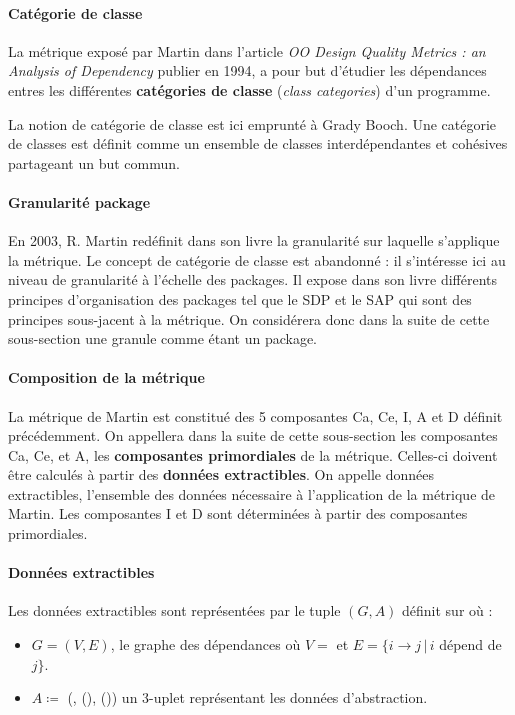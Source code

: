 \documentclass{scrartcl}
\begin{document}
    \paragraph{Catégorie de classe}La métrique exposé par Martin dans l'article \textit{OO Design Quality Metrics : an Analysis of Dependency}\cite{Martin:1994} publier en 1994, a pour but d'étudier les dépendances entres les différentes \textbf{catégories de classe} (\emph{class categories}) d'un programme. 
    
    La notion de catégorie de classe est ici emprunté à Grady Booch\cite{Booch:1991}. Une catégorie de classes est définit comme un ensemble de classes interdépendantes et cohésives partageant un but commun.
    
    \paragraph{Granularité package}En 2003, R. Martin redéfinit dans son livre\cite{Martin:2003} la granularité sur laquelle s'applique la métrique. Le concept de catégorie de classe est abandonné : il s'intéresse ici au niveau de granularité à l'échelle des packages. Il expose dans son livre différents principes d'organisation des packages tel que le SDP et le SAP qui sont des principes sous-jacent à la métrique. On considérera donc dans la suite de cette sous-section une granule comme étant un package.



    \paragraph{Composition de la métrique}La métrique de Martin est constitué des 5 composantes Ca, Ce, I, A et D définit précédemment. On appellera dans la suite de cette sous-section les composantes Ca, Ce, et A, les \textbf{composantes primordiales} de la métrique. Celles-ci doivent être calculés à partir des \textbf{données extractibles}. On appelle données extractibles, l'ensemble des données nécessaire à l'application de la métrique de Martin. Les composantes I et D sont déterminées à partir des composantes primordiales.
    
    \paragraph{Données extractibles}Les données extractibles sont représentées par le tuple $(G, A)$ définit sur \granuleUniverse{} où :
    \begin{itemize}
        \item $G = (V, E)$, le graphe des dépendances où $V = $ \granuleUniverse{} et $E = \{i \to j \, | \, i $ dépend de $j\}$.
        \item $A \coloneqq$ (\granule{}, \numberOfClass{}(\granule{}), \numberOfabstractClass{}(\granule{})) un 3-uplet représentant les données d'abstraction.
    \end{itemize}
    
\end{document}
